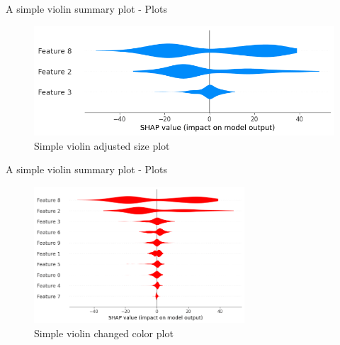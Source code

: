 \documentclass[aspectratio=169]{beamer}
\begin{document}
\begin{frame}{A simple violin summary plot - Plots}

    \begin{figure}[htbp]
        \centering
        \includegraphics[width=1\textwidth]{figs/shap/plots/violin/example_notebooks_api_examples_plots_violin_5_0.png}
        \caption{Simple violin adjusted size plot}
        \label{fig:simple-violin-plot-adjusted-size}
    \end{figure}
\end{frame}

\begin{frame}{A simple violin summary plot - Plots}

    \begin{figure}[htbp]
        \centering
        \includegraphics[width=0.7\textwidth]{figs/shap/plots/violin/example_notebooks_api_examples_plots_violin_7_0.png}
        \caption{Simple violin changed color plot}
        \label{fig:simple-violin-plot-color}
    \end{figure}
\end{frame}
\end{document}
